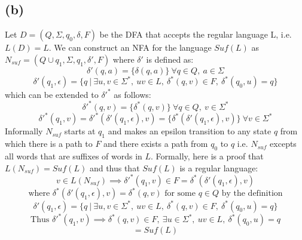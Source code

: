\documentclass[12pt]{article}
\begin{document}
\subsection*{(b)}
  Let $D = (Q, \Sigma, q_0, \delta, F)$ be the DFA that accepts the regular
  language L, i.e. $L(D) = L$. We can construct an NFA for the language
  $Suf(L)$ as $N_{suf} = (Q\cup{q_1}, \Sigma, q_1, \delta{'}, F)$
  where $\delta{'}$ is defined as:
  $$\delta{'}(q, a) = \{\delta(q,a)\} \: \forall q \in Q ,\: a \in \Sigma$$
  $$\delta{'}(q_1, \epsilon) = \{q \:|\: \exists u,v \in \Sigma^* ,\:
  uv \in L ,\: \delta^* (q,v) \in F ,\: \delta^* (q_0,u) = q\}$$
  which can be extended to $\delta{'}^*$ as follows:
  $$\delta{'}^*(q, v) = \{\delta^*(q,v)\} \:
  \forall q \in Q ,\: v \in \Sigma^*$$
  $$\delta{'}^*(q_1, v) = \delta{'}^*(\delta{'}(q_1, \epsilon), v) =
  \{\delta^*(\delta{'}(q_1, \epsilon), v)\} \: \forall v \in \Sigma^*$$
  Informally $N_{suf}$ starts at $q_1$ and makes
  an epsilon transition to any state $q$ from which there is a path to $F$ and
  there exists a path from $q_0$ to $q$ i.e. $N_{suf}$ excepts all words that
  are suffixes of words in $L$. Formally, here is a proof that
  $L(N_{suf}) = Suf(L)$ and thus that $Suf(L)$ is a regular language:
  $$ v \in L(N_{suf}) \implies \delta{'}^*(q_1, v) \in F =
  \delta^*(\delta{'}(q_1, \epsilon), v) $$
  $$\text{where }\delta^*(\delta{'}(q_1, \epsilon), v) = \delta^*(q, v)
  \text{ for some } q \in Q \text{ by the definition}$$
  $$\delta{'}(q_1, \epsilon) = \{q \:|\: \exists u,v \in \Sigma^* ,\:
  uv \in L ,\: \delta^* (q,v) \in F ,\: \delta^* (q_0,u) = q\}$$
  $$\text{Thus }\delta{'}^* (q_1,v) \implies
  \delta^* (q,v) \in F ,\: \exists u \in \Sigma^* ,\: uv \in L ,\:
  \delta^* (q_0,u) = q$$
  $$ = Suf(L)$$
\end{document}
